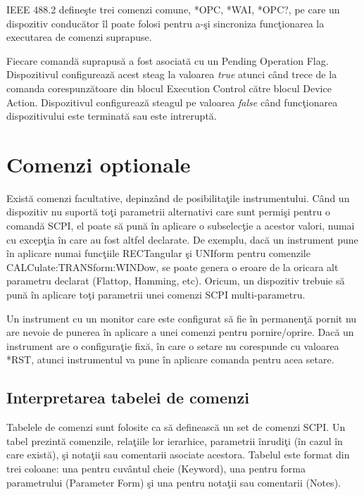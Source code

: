 IEEE 488.2 define\c{s}te trei comenzi comune, *OPC, *WAI, *OPC?, pe care un dispozitiv conduc\u{a}tor \^{i}l poate folosi pentru a-\c{s}i sincroniza func\c{t}ionarea la executarea de comenzi suprapuse.

Fiecare comand\u{a} suprapus\u{a} a fost asociat\u{a} cu un Pending Operation Flag. Dispozitivul configureaz\u{a} acest steag la valoarea \emph{true} atunci c\^{a}nd trece de la comanda corespunz\u{a}toare din blocul Execution Control c\u{a}tre blocul Device Action. Dispozitivul configureaz\u{a} steagul pe valoarea \emph{false} c\^{a}nd func\c{t}ionarea dispozitivului este terminat\u{a} sau este intrerupt\u{a}.

\section{Comenzi optionale}
Exist\u{a} comenzi facultative, depinz\^{a}nd de posibilita\c{t}ile instrumentului. C\^{a}nd un dispozitiv nu suport\u{a} to\c{t}i parametrii alternativi care sunt permi\c{s}i pentru o comand\u{a} SCPI, el poate s\u{a} pun\u{a} \^{i}n aplicare o subselec\c{t}ie a acestor valori, numai cu excep\c{t}ia \^{i}n care au fost altfel declarate. De exemplu, dac\u{a} un instrument pune \^{i}n aplicare numai func\c{t}iile RECTangular \c{s}i UNIform pentru comenzile CALCulate:TRANSform:WINDow, se poate genera o eroare de la oricara alt parametru declarat (Flattop, Hamming, etc). Oricum, un dispozitiv trebuie s\u{a} pun\u{a} \^{i}n aplicare to\c{t}i parametrii unei comenzi SCPI multi-parametru.

Un instrument cu un monitor care este configurat s\u{a} fie \^{i}n permanen\c{t}\u{a} pornit nu are nevoie de punerea \^{i}n aplicare a unei comenzi pentru pornire/oprire. Dac\u{a} un instrument are o configura\c{t}ie fix\u{a}, \^{i}n care o setare nu corespunde cu valoarea *RST, atunci instrumentul va pune \^{i}n aplicare comanda pentru acea setare.

\subsection{Interpretarea tabelei de comenzi}
Tabelele de comenzi sunt folosite ca s\u{a} defineasc\u{a} un set de comenzi SCPI. Un tabel prezint\u{a} comenzile, rela\c{t}iile lor ierarhice, parametrii \^{i}nrudi\c{t}i (\^{i}n cazul \^{i}n care exist\u{a}), \c{s}i nota\c{t}ii sau comentarii asociate acestora. Tabelul este format din trei coloane: una pentru cuv\^{a}ntul cheie (Keyword), una pentru forma parametrului (Parameter Form) \c{s}i una pentru nota\c{t}ii sau comentarii (Notes).

